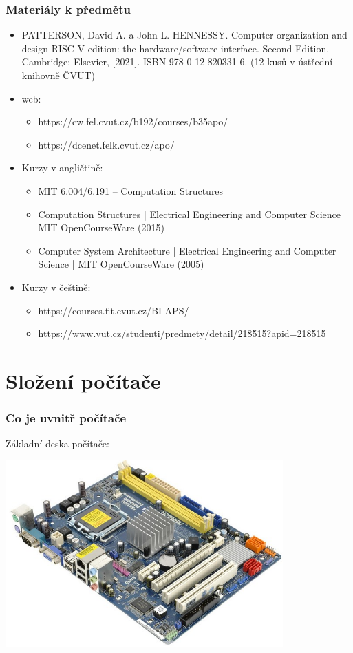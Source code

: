 \documentclass{beamer}
\begin{document}
\begin{frame}
\frametitle{Materiály k předmětu}
\begin{itemize}
\item PATTERSON, David A. a John L. HENNESSY. Computer organization and design RISC-V edition:
    the hardware/software interface. Second Edition. Cambridge: Elsevier, [2021].
    ISBN 978-0-12-820331-6. (12 kusů v ústřední knihovně ČVUT)
\item web:
\begin{itemize}
\item https://cw.fel.cvut.cz/b192/courses/b35apo/
\item https://dcenet.felk.cvut.cz/apo/
\end{itemize}
\item Kurzy v angličtině:
\begin{itemize}
\item MIT 6.004/6.191 – Computation Structures
\item Computation Structures | Electrical Engineering and Computer Science | MIT OpenCourseWare (2015)
\item Computer System Architecture | Electrical Engineering and Computer Science | MIT OpenCourseWare (2005)
\end{itemize}
\item Kurzy v češtině:
\begin{itemize}
\item https://courses.fit.cvut.cz/BI-APS/
\item https://www.vut.cz/studenti/predmety/detail/218515?apid=218515
\end{itemize}

\end{itemize}
\end{frame}

\section{Složení počítače}
\begin{frame}
\frametitle{Co je uvnitř počítače}

Základní deska počítače:
\begin{center}
   \includegraphics[width=0.8\textwidth]{fig/motherboard.jpg}
\end{center}

\end{frame}
\end{document}
